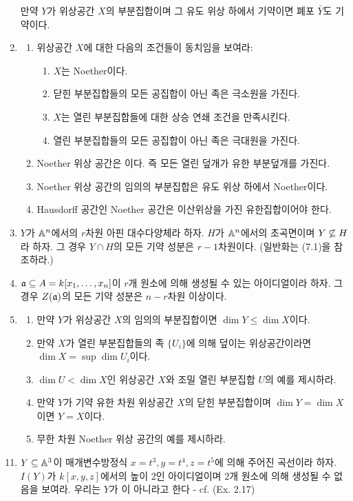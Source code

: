 \begin{enumerate}[label=\tb{1.\arabic*.},itemindent=0mm,itemsep=2mm]
	만약 $Y$가 위상공간 $X$의 부분집합이며 그 유도 위상 하에서 기약이면 폐포 $\bar Y$도 기약이다.
	\item \begin{enumerate}[label=(\alph*)]
	\item 위상공간 $X$에 대한 다음의 조건들이 동치임을 보여라:
	\begin{enumerate}[label=(\roman*)]
	\item $X$는 Noether이다.
	\item 닫힌 부분집합들의 모든 공집합이 아닌 족은 극소원을 가진다.
	\item $X$는 열린 부분집합들에 대한 상승 연쇄 조건을 만족시킨다.
	\item 열린 부분집합들의 모든 공집합이 아닌 족은 극대원을 가진다.
	\end{enumerate}
	\item Noether 위상 공간은 이다. 즉 모든 열린 덮개가 유한 부분덮개를 가진다.
	\item Noether 위상 공간의 임의의 부분집합은 유도 위상 하에서 Noether이다.
	\item Hausdorff 공간인 Noether 공간은 이산위상을 가진 유한집합이어야 한다.
	\end{enumerate}
	\item $Y$가 $\mathbb{A}^n$에서의 $r$차원 아핀 대수다양체라 하자. $H$가 $\mathbb{A}^n$에서의 초곡면이며 $Y\not\subseteq H$라 하자.
	그 경우 $Y\cap H$의 모든 기약 성분은 $r-1$차원이다. (일반화는 (7.1)을 참조하라.)
	\item $\mathfrak{a}\subseteq A=k[x_1,\ldots,x_n]$이 $r$개 원소에 의해 생성될 수 있는 아이디얼이라 하자.
	그 경우 $Z(\mathfrak{a})$의 모든 기약 성분은 $n-r$차원 이상이다.
	\item \begin{enumerate}[label=(\alph*)]
	\item 만약 $Y$가 위상공간 $X$의 임의의 부분집합이면 $\dim Y\le\dim X$이다.
	\item 만약 $X$가 열린 부분집합들의 족 $\{U_i\}$에 의해 덮이는 위상공간이라면 $\dim X=\sup\dim U_i$이다.
	\item $\dim U<\dim X$인 위상공간 $X$와 조밀 열린 부분집합 $U$의 예를 제시하라.
	\item 만약 $Y$가 기약 유한 차원 위상공간 $X$의 닫힌 부분집합이며 $\dim Y=\dim X$이면 $Y=X$이다.
	\item 무한 차원 Noether 위상 공간의 예를 제시하라.
	\end{enumerate}
	\end{enumerate}
	\begin{enumerate}[label=\tb{*1.\arabic*.},itemindent=0mm,topsep=2mm]
	\setcounter{enumi}{10}
	\item $Y\subseteq\mathbb{A}^3$이 매개변수방정식 $x=t^3,y=t^4,z=t^5$에 의해 주어진 곡선이라 하자.
	$I(Y)$가 $k[x,y,z]$에서의 높이 2인 아이디얼이며 2개 원소에 의해 생성될 수 없음을 보여라.
	우리는 $Y$가 이 아니라고 한다 - cf. (Ex. 2.17)
	\end{enumerate}
